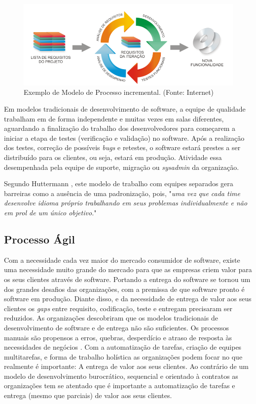 \begin{figure}[!ht]
\centering
\includegraphics[width=.75\textwidth]{fig/figura22.png}
\caption{Exemplo de Modelo de Processo incremental. (Fonte: Internet)}
\label{fig:figure22}
\end{figure}

Em modelos tradicionais de desenvolvimento de software, a equipe de qualidade trabalham em de forma independente e muitas vezes em salas diferentes, aguardando a finalização do trabalho dos desenvolvedores para começarem a iniciar a etapa de testes (verificação e validação) no software. 
Após a realização dos testes, correção de possíveis \textit{bugs} e retestes, o software estará prestes a ser distribuído para os clientes, ou seja, estará em produção. Atividade essa desempenhada pela equipe de suporte, migração ou \textit{sysadmin} da organização.

Segundo Huttermann \cite{huttermann2012}, este modelo de trabalho com equipes separados gera barreiras como a ausência de uma padronização, pois, "\textit{uma vez que cada time desenvolve idioma próprio trabalhando em seus problemas individualmente e não em prol de um único objetivo.}" 

\subsection{Processo Ágil}

Com a necessidade cada vez maior do mercado consumidor de software, existe uma necessidade muito grande do mercado para que as empresas criem valor para os seus clientes através de software. Portando a entrega do software se tornou um dos grandes desafios das organizações, com a premissa de que software pronto é software em produção. Diante disso, e da necessidade de entrega de valor aos seus clientes os \textit{gaps} entre requisito, codificação, teste e entregam precisaram ser reduzidos. As organizações descobriram que os modelos tradicionais de desenvolvimento de software e de entrega não são suficientes. Os processos manuais são propensos a erros, quebras, desperdício e atraso de resposta às necessidades de negócios \cite{BRAGA2015}. Com a automatização de tarefas, criação de equipes multitarefas, e forma de trabalho holística as organizações podem focar no que realmente é importante: A entrega de valor aos seus clientes. Ao contrário de um modelo de desenvolvimento burocrático, sequencial e orientado à contratos as organizações tem se atentado que é importante a automatização de tarefas e entrega (mesmo que parciais) de valor aos seus clientes.

